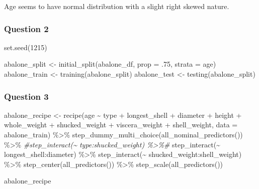 \documentclass[
]{article}
\newenvironment{Shaded}{\begin{snugshade}}{\end{snugshade}}
\newcommand{\AttributeTok}[1]{\textcolor[rgb]{0.77,0.63,0.00}{#1}}
\newcommand{\CommentTok}[1]{\textcolor[rgb]{0.56,0.35,0.01}{\textit{#1}}}
\newcommand{\DecValTok}[1]{\textcolor[rgb]{0.00,0.00,0.81}{#1}}
\newcommand{\FunctionTok}[1]{\textcolor[rgb]{0.00,0.00,0.00}{#1}}
\newcommand{\NormalTok}[1]{#1}
\newcommand{\OtherTok}[1]{\textcolor[rgb]{0.56,0.35,0.01}{#1}}
\newcommand{\SpecialCharTok}[1]{\textcolor[rgb]{0.00,0.00,0.00}{#1}}
\begin{document}
Age seems to have normal distribution with a slight right skewed nature.

\hypertarget{question-2}{%
\subsubsection{Question 2}\label{question-2}}

\begin{Shaded}
\begin{Highlighting}[]
\FunctionTok{set.seed}\NormalTok{(}\DecValTok{1215}\NormalTok{)}

\NormalTok{abalone\_split }\OtherTok{\textless{}{-}} \FunctionTok{initial\_split}\NormalTok{(abalone\_df, }\AttributeTok{prop =}\NormalTok{ .}\DecValTok{75}\NormalTok{, }\AttributeTok{strata =}\NormalTok{ age)}
\NormalTok{abalone\_train }\OtherTok{\textless{}{-}} \FunctionTok{training}\NormalTok{(abalone\_split)}
\NormalTok{abalone\_test }\OtherTok{\textless{}{-}} \FunctionTok{testing}\NormalTok{(abalone\_split)}
\end{Highlighting}
\end{Shaded}

\hypertarget{question-3}{%
\subsubsection{Question 3}\label{question-3}}

\begin{Shaded}
\begin{Highlighting}[]
\NormalTok{abalone\_recipe }\OtherTok{\textless{}{-}} \FunctionTok{recipe}\NormalTok{(age }\SpecialCharTok{\textasciitilde{}}\NormalTok{  type }\SpecialCharTok{+}\NormalTok{ longest\_shell }\SpecialCharTok{+}\NormalTok{ diameter }\SpecialCharTok{+}\NormalTok{ height }\SpecialCharTok{+}\NormalTok{  whole\_weight }\SpecialCharTok{+}\NormalTok{ shucked\_weight }\SpecialCharTok{+}\NormalTok{ viscera\_weight  }\SpecialCharTok{+}\NormalTok{ shell\_weight, }\AttributeTok{data =}\NormalTok{ abalone\_train) }\SpecialCharTok{\%\textgreater{}\%} 
  \FunctionTok{step\_dummy\_multi\_choice}\NormalTok{(}\FunctionTok{all\_nominal\_predictors}\NormalTok{()) }\SpecialCharTok{\%\textgreater{}\%} 
  \CommentTok{\#step\_interact(\textasciitilde{} type:shucked\_weight) \%\textgreater{}\%\#}
  \FunctionTok{step\_interact}\NormalTok{(}\SpecialCharTok{\textasciitilde{}}\NormalTok{ longest\_shell}\SpecialCharTok{:}\NormalTok{diameter) }\SpecialCharTok{\%\textgreater{}\%} 
  \FunctionTok{step\_interact}\NormalTok{(}\SpecialCharTok{\textasciitilde{}}\NormalTok{ shucked\_weight}\SpecialCharTok{:}\NormalTok{shell\_weight) }\SpecialCharTok{\%\textgreater{}\%} 
  \FunctionTok{step\_center}\NormalTok{(}\FunctionTok{all\_predictors}\NormalTok{()) }\SpecialCharTok{\%\textgreater{}\%} 
  \FunctionTok{step\_scale}\NormalTok{(}\FunctionTok{all\_predictors}\NormalTok{())}

\NormalTok{abalone\_recipe}
\end{Highlighting}
\end{Shaded}
\end{document}
